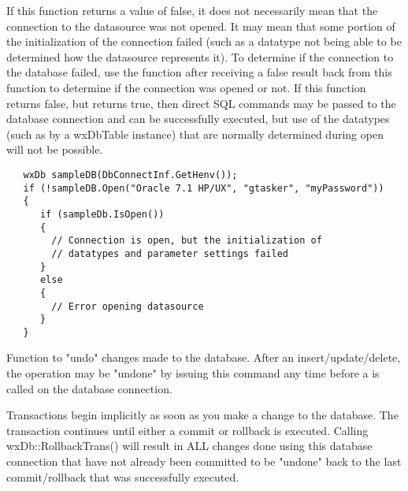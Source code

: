 If this function returns a value of false, it does not necessarily mean that
the connection to the datasource was not opened.  It may mean that some
portion of the initialization of the connection failed (such as a datatype not
being able to be determined how the datasource represents it).  To determine
if the connection to the database failed, use the 
function after receiving a false result back from this function to determine if
the connection was opened or not.  If this function returns false, but 
returns true, then direct SQL commands may be passed to the database
connection and can be successfully executed, but use of the datatypes (such as
by a wxDbTable instance) that are normally determined during open will not be
possible.



\begin{verbatim}
   wxDb sampleDB(DbConnectInf.GetHenv());
   if (!sampleDB.Open("Oracle 7.1 HP/UX", "gtasker", "myPassword"))
   {
      if (sampleDb.IsOpen())
      {
        // Connection is open, but the initialization of
        // datatypes and parameter settings failed
      }
      else
      {
        // Error opening datasource
      }
   }
\end{verbatim}

\label{wxdbrollbacktrans}


Function to "undo" changes made to the database.  After an insert/update/delete, the operation may be "undone" by issuing this command any time before a  is called on the database connection.


Transactions begin implicitly as soon as you make a change to the database.  The
transaction continues until either a commit or rollback is executed.  Calling
wxDb::RollbackTrans() will result in ALL changes done using this database
connection that have not already been committed to be "undone" back to the last
commit/rollback that was successfully executed.

